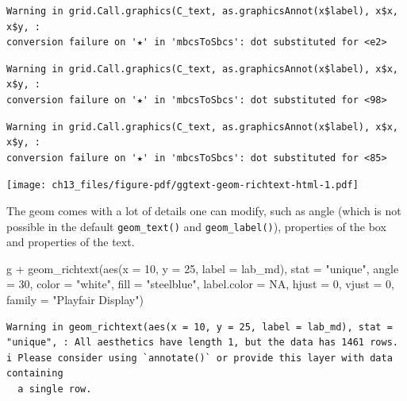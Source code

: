 \documentclass[
  letterpaper,
]{scrbook}
\newenvironment{Shaded}{\begin{snugshade}}{\end{snugshade}}
\newcommand{\AttributeTok}[1]{\textcolor[rgb]{0.40,0.45,0.13}{#1}}
\newcommand{\ConstantTok}[1]{\textcolor[rgb]{0.56,0.35,0.01}{#1}}
\newcommand{\DecValTok}[1]{\textcolor[rgb]{0.68,0.00,0.00}{#1}}
\newcommand{\FunctionTok}[1]{\textcolor[rgb]{0.28,0.35,0.67}{#1}}
\newcommand{\NormalTok}[1]{\textcolor[rgb]{0.00,0.23,0.31}{#1}}
\newcommand{\SpecialCharTok}[1]{\textcolor[rgb]{0.37,0.37,0.37}{#1}}
\newcommand{\StringTok}[1]{\textcolor[rgb]{0.13,0.47,0.30}{#1}}
\begin{document}
\begin{verbatim}
Warning in grid.Call.graphics(C_text, as.graphicsAnnot(x$label), x$x, x$y, :
conversion failure on '★' in 'mbcsToSbcs': dot substituted for <e2>
\end{verbatim}

\begin{verbatim}
Warning in grid.Call.graphics(C_text, as.graphicsAnnot(x$label), x$x, x$y, :
conversion failure on '★' in 'mbcsToSbcs': dot substituted for <98>
\end{verbatim}

\begin{verbatim}
Warning in grid.Call.graphics(C_text, as.graphicsAnnot(x$label), x$x, x$y, :
conversion failure on '★' in 'mbcsToSbcs': dot substituted for <85>
\end{verbatim}

\texttt{[image: ch13\_files/figure-pdf/ggtext-geom-richtext-html-1.pdf]}

The geom comes with a lot of details one can modify, such as angle
(which is not possible in the default \texttt{geom\_text()} and
\texttt{geom\_label()}), properties of the box and properties of the
text.

\begin{Shaded}
\begin{Highlighting}[]
\NormalTok{g }\SpecialCharTok{+}
  \FunctionTok{geom\_richtext}\NormalTok{(}\FunctionTok{aes}\NormalTok{(}\AttributeTok{x =} \DecValTok{10}\NormalTok{, }\AttributeTok{y =} \DecValTok{25}\NormalTok{, }\AttributeTok{label =}\NormalTok{ lab\_md),}
                \AttributeTok{stat =} \StringTok{"unique"}\NormalTok{, }\AttributeTok{angle =} \DecValTok{30}\NormalTok{,}
                \AttributeTok{color =} \StringTok{"white"}\NormalTok{, }\AttributeTok{fill =} \StringTok{"steelblue"}\NormalTok{,}
                \AttributeTok{label.color =} \ConstantTok{NA}\NormalTok{, }\AttributeTok{hjust =} \DecValTok{0}\NormalTok{, }\AttributeTok{vjust =} \DecValTok{0}\NormalTok{,}
                \AttributeTok{family =} \StringTok{"Playfair Display"}\NormalTok{)}
\end{Highlighting}
\end{Shaded}

\begin{verbatim}
Warning in geom_richtext(aes(x = 10, y = 25, label = lab_md), stat = "unique", : All aesthetics have length 1, but the data has 1461 rows.
i Please consider using `annotate()` or provide this layer with data containing
  a single row.
\end{verbatim}
\end{document}
